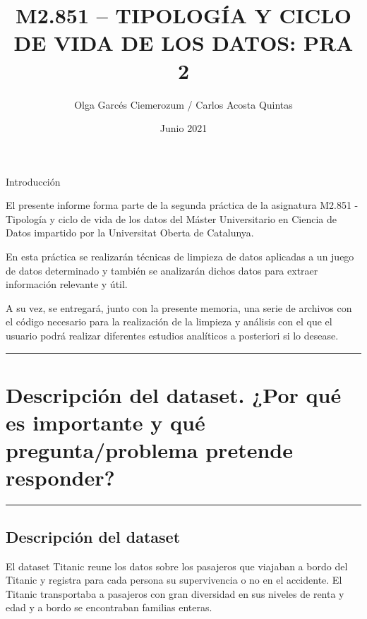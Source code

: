 \documentclass[
]{article}
\title{\textbf{M2.851 -- TIPOLOGÍA Y CICLO DE VIDA DE LOS DATOS: PRA 2}}
\author{Olga Garcés Ciemerozum / Carlos Acosta Quintas}
\date{Junio 2021}
\begin{document}
\maketitle

{
\setcounter{tocdepth}{2}
\tableofcontents
}
Introducción

El presente informe forma parte de la segunda práctica de la asignatura
M2.851 - Tipología y ciclo de vida de los datos del Máster Universitario
en Ciencia de Datos impartido por la Universitat Oberta de Catalunya.

En esta práctica se realizarán técnicas de limpieza de datos aplicadas a
un juego de datos determinado y también se analizarán dichos datos para
extraer información relevante y útil.

A su vez, se entregará, junto con la presente memoria, una serie de
archivos con el código necesario para la realización de la limpieza y
análisis con el que el usuario podrá realizar diferentes estudios
analíticos a posteriori si lo desease.

\begin{center}\rule{0.5\linewidth}{0.5pt}\end{center}

\hypertarget{descripciuxf3n-del-dataset.-por-quuxe9-es-importante-y-quuxe9-preguntaproblema-pretende-responder}{%
\section{\texorpdfstring{\textbf{Descripción del dataset. ¿Por qué es
importante y qué pregunta/problema pretende
responder?}}{Descripción del dataset. ¿Por qué es importante y qué pregunta/problema pretende responder?}}\label{descripciuxf3n-del-dataset.-por-quuxe9-es-importante-y-quuxe9-preguntaproblema-pretende-responder}}

\begin{center}\rule{0.5\linewidth}{0.5pt}\end{center}

\hypertarget{descripciuxf3n-del-dataset}{%
\subsection{\texorpdfstring{\textbf{Descripción del
dataset}}{Descripción del dataset}}\label{descripciuxf3n-del-dataset}}

El dataset Titanic reune los datos sobre los pasajeros que viajaban a
bordo del Titanic y registra para cada persona su supervivencia o no en
el accidente. El Titanic transportaba a pasajeros con gran diversidad en
sus niveles de renta y edad y a bordo se encontraban familias enteras.
\end{document}
